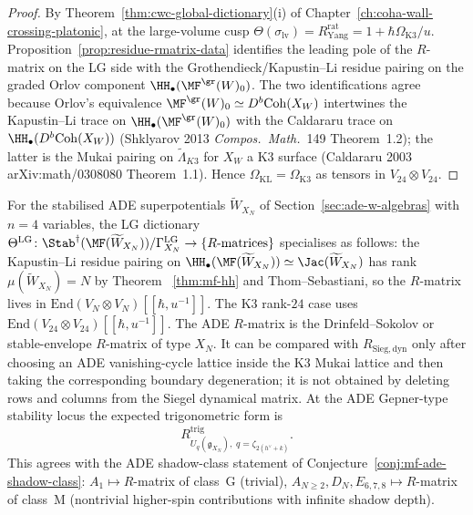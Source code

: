 \begin{proof}
By Theorem~\ref{thm:cwc-global-dictionary}(i) of
Chapter~\ref{ch:coha-wall-crossing-platonic}, at the large-volume cusp
$\Theta(\sigma_{\mathrm{lv}})=R^{\mathrm{rat}}_{\mathrm{Yang}}
=1+\hbar\Omega_{\mathrm{K3}}/u$. Proposition~\ref{prop:residue-rmatrix-data}
identifies the leading pole of the $R$-matrix on the LG side with the
Grothendieck/Kapustin--Li residue pairing on the graded Orlov component
\(\HH_\bullet(\MF^{\gr}(W)_0)\). The two identifications agree
because Orlov's equivalence $\MF^{\gr}(W)_0\simeq D^b\mathrm{Coh}(X_W)$
intertwines the Kapustin--Li trace on $\HH_\bullet(\MF^{\gr}(W)_0)$ with
the Caldararu trace on $\HH_\bullet(D^b\mathrm{Coh}(X_W))$
(Shklyarov 2013 \emph{Compos.\ Math.}~149 Theorem~1.2); the latter is
the Mukai pairing on $\widetilde{\Lambda}_{K3}$ for $X_W$ a K3 surface
(Caldararu 2003 \textup{arXiv:math/0308080} Theorem~1.1). Hence
$\Omega_{\mathrm{KL}}=\Omega_{\mathrm{K3}}$ as tensors in
$V_{24}\otimes V_{24}$.
\end{proof}

\begin{remark}
\label{rem:mf-ade-restriction}
For the stabilised ADE superpotentials $\widetilde{W}_{X_N}$ of
Section~\ref{sec:ade-w-algebras} with $n=4$ variables, the
LG dictionary
$\Theta^{\mathrm{LG}}\colon\Stab^\dagger(\MF(\widetilde{W}_{X_N}))/
\Gamma^{\mathrm{LG}}_{X_N}\to\{R\text{-matrices}\}$ specialises as
follows: the Kapustin--Li residue pairing on
$\HH_\bullet(\MF(\widetilde{W}_{X_N}))\simeq\Jac(\widetilde{W}_{X_N})$
has rank $\mu(\widetilde{W}_{X_N})=N$ by Theorem~%
\ref{thm:mf-hh} and Thom--Sebastiani, so the $R$-matrix lives in
$\mathrm{End}(V_N\otimes V_N)[[\hbar,u^{-1}]]$. The K3 rank-$24$ case
uses $\mathrm{End}(V_{24}\otimes V_{24})[[\hbar,u^{-1}]]$. The ADE
$R$-matrix is the Drinfeld--Sokolov or stable-envelope
$R$-matrix of type \(X_N\). It can be compared with
\(R_{\mathrm{Sieg,dyn}}\) only after choosing an ADE vanishing-cycle
lattice inside the K3 Mukai lattice and then taking the corresponding
boundary degeneration; it is not obtained by deleting rows and columns
from the Siegel dynamical matrix. At the ADE Gepner-type stability locus
the expected trigonometric form is
\[
R^{\mathrm{trig}}_{U_q(\mathfrak{g}_{X_N}),\;q=\zeta_{2(h^\vee+k)}} .
\]
This agrees with the ADE shadow-class statement of
Conjecture~\ref{conj:mf-ade-shadow-class}:
$A_1\mapsto R$-matrix of class~G (trivial),
$A_{N\geq 2}, D_N, E_{6,7,8}\mapsto R$-matrix of class~M (nontrivial
higher-spin contributions with infinite shadow depth).
\end{remark}

